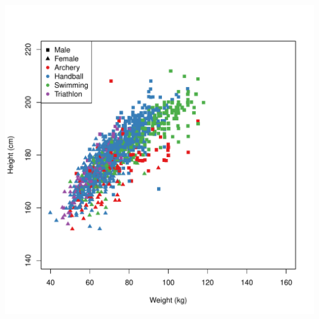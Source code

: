 \documentclass[landscape, paperwidth=42in, paperheight=36in,
fontscale=.35, margin=1in]{baposter}
\begin{document}
\begin{poster}
{\begin{center}
\begin{minipage}{0.45\textwidth}
\begin{center}
      \includegraphics[scale=0.20]{../graphics/swimming.pdf}
    \end{center}
  \end{minipage}


\end{center}}
\end{poster}
\end{document}
